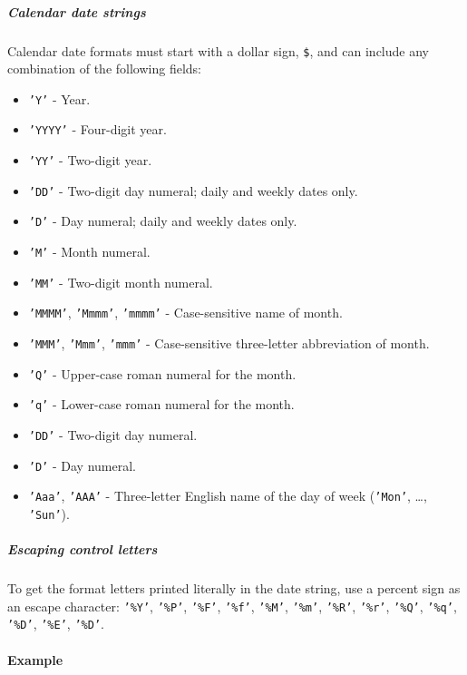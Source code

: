 \subparagraph{Calendar date strings}

Calendar date formats must start with a dollar sign, \texttt{\$}, and
can include any combination of the following fields:

\begin{itemize}
\item
  \texttt{'Y'} - Year.
\item
  \texttt{'YYYY'} - Four-digit year.
\item
  \texttt{'YY'} - Two-digit year.
\item
  \texttt{'DD'} - Two-digit day numeral; daily and weekly dates only.
\item
  \texttt{'D'} - Day numeral; daily and weekly dates only.
\item
  \texttt{'M'} - Month numeral.
\item
  \texttt{'MM'} - Two-digit month numeral.
\item
  \texttt{'MMMM'}, \texttt{'Mmmm'}, \texttt{'mmmm'} - Case-sensitive
  name of month.
\item
  \texttt{'MMM'}, \texttt{'Mmm'}, \texttt{'mmm'} - Case-sensitive
  three-letter abbreviation of month.
\item
  \texttt{'Q'} - Upper-case roman numeral for the month.
\item
  \texttt{'q'} - Lower-case roman numeral for the month.
\item
  \texttt{'DD'} - Two-digit day numeral.
\item
  \texttt{'D'} - Day numeral.
\item
  \texttt{'Aaa'}, \texttt{'AAA'} - Three-letter English name of the day
  of week (\texttt{'Mon'}, \ldots{}, \texttt{'Sun'}).
\end{itemize}

\subparagraph{Escaping control letters}

To get the format letters printed literally in the date string, use a
percent sign as an escape character: \texttt{'\%Y'}, \texttt{'\%P'},
\texttt{'\%F'}, \texttt{'\%f'}, \texttt{'\%M'}, \texttt{'\%m'},
\texttt{'\%R'}, \texttt{'\%r'}, \texttt{'\%Q'}, \texttt{'\%q'},
\texttt{'\%D'}, \texttt{'\%E'}, \texttt{'\%D'}.

\paragraph{Example}


